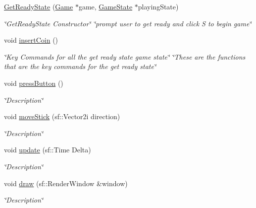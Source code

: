 \begin{DoxyCompactItemize}
\item 
\hyperlink{classGetReadyState_a4b541b06511665065c171a577c58ef07}{Get\+Ready\+State} (\hyperlink{classGame}{Game} $\ast$game, \hyperlink{classGameState}{Game\+State} $\ast$playing\+State)
\begin{DoxyCompactList}\small\item\em \char`\"{}\+Get\+Ready\+State Constructor\char`\"{}  \char`\"{}prompt user to get ready and click S to begin game\char`\"{} \end{DoxyCompactList}\item 
\mbox{\label{classGetReadyState_afac1da927d38cf32960f2370856ec9f6}} 
void \hyperlink{classGetReadyState_afac1da927d38cf32960f2370856ec9f6}{insert\+Coin} ()
\begin{DoxyCompactList}\small\item\em \char`\"{}\+Key Commands for all the get ready state game state\char`\"{}  \char`\"{}\+These are the functions that are the key commands for the get ready state\char`\"{} \end{DoxyCompactList}\item 
void \hyperlink{classGetReadyState_a414a505ec783b1bf577b1b859abaee46}{press\+Button} ()
\begin{DoxyCompactList}\small\item\em \char`\"{}\+Description\char`\"{} \end{DoxyCompactList}\item 
void \hyperlink{classGetReadyState_ab3073757951c1d757c8f4550bbb1c229}{move\+Stick} (sf\+::\+Vector2i direction)
\begin{DoxyCompactList}\small\item\em \char`\"{}\+Description\char`\"{} \end{DoxyCompactList}\item 
void \hyperlink{classGetReadyState_a412486c612eee1d8c4821706dd7b3206}{update} (sf\+::\+Time Delta)
\begin{DoxyCompactList}\small\item\em \char`\"{}\+Description\char`\"{} \end{DoxyCompactList}\item 
void \hyperlink{classGetReadyState_a5e31ebfea8bddad603d4e25a6e2eea15}{draw} (sf\+::\+Render\+Window \&window)
\begin{DoxyCompactList}\small\item\em \char`\"{}\+Description\char`\"{} \end{DoxyCompactList}\end{DoxyCompactItemize}
